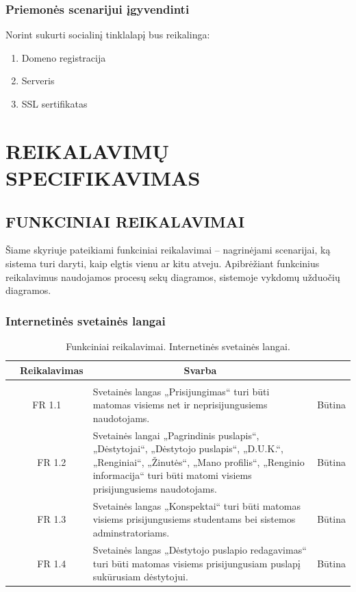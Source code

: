 \documentclass{VUMIFPSkursinis}
\begin{document}
\subsubsection{Priemonės scenarijui įgyvendinti}
Norint sukurti socialinį tinklalapį bus reikalinga:
\begin{enumerate}
	\item Domeno registracija
	\item Serveris
	\item SSL sertifikatas
\end{enumerate}
\newpage
\section{REIKALAVIMŲ SPECIFIKAVIMAS}
\subsection{FUNKCINIAI REIKALAVIMAI}
Šiame skyriuje pateikiami funkciniai reikalavimai – nagrinėjami scenarijai, ką sistema turi daryti, kaip elgtis vienu ar kitu atveju. Apibrėžiant funkcinius reikalavimus naudojamos procesų sekų diagramos, sistemoje vykdomų užduočių diagramos.
\subsubsection{Internetinės svetainės langai}
\begin{table}[H]
	\caption{Funkciniai reikalavimai. Internetinės svetainės langai.}
	\begin{tabular}{|p{1cm}|p{1cm}|p{}|p{}|}
		\hline 
		\rowcolor{gray!50}
		\multicolumn{2}{|c|}{{\bfseries Kodas}}&
		\multicolumn{1}{c|}{{\bfseries Reikalavimas}}&
		\multicolumn{1}{c|}{{\bfseries Svarba}}\\
		\hline
		\rowcolor{lightgray}
		\multicolumn{4}{|c|}{Internetinės svetainės langai}\\		
		
		\hline
		\multicolumn{2}{|c|}{FR 1.1}&
		{Svetainės langas „Prisijungimas“ turi būti matomas visiems net ir neprisijungusiems naudotojams.
		}&		
		\multicolumn{1}{c|}{Būtina}\\
		\hline
		\multicolumn{1}{|c}{}&
		\multicolumn{1}{c|}{FR 1.2}&
		{Svetainės langai „Pagrindinis puslapis“, „Dėstytojai“, „Dėstytojo puslapis“, „D.U.K.“, „Renginiai“, „Žinutės“, „Mano profilis“, „Renginio informacija“ turi būti matomi visiems prisijungusiems naudotojams.
		}&		
		\multicolumn{1}{c|}{Būtina}\\
		\hline
		\multicolumn{1}{|c}{}&
		\multicolumn{1}{c|}{FR 1.3}&
		{Svetainės langas „Konspektai“ turi būti matomas visiems prisijungusiems studentams bei sistemos adminstratoriams.
		}&
		\multicolumn{1}{c|}{Būtina}\\	
		\hline		
		\multicolumn{1}{|c}{}&
		\multicolumn{1}{c|}{FR 1.4}&
		{Svetainės langas „Dėstytojo puslapio redagavimas“ turi būti matomas visiems prisijungusiam puslapį sukūrusiam dėstytojui.
		}&
		\multicolumn{1}{c|}{Būtina}\\									
		\hline
	\end{tabular}		
\end{table}
\end{document}
